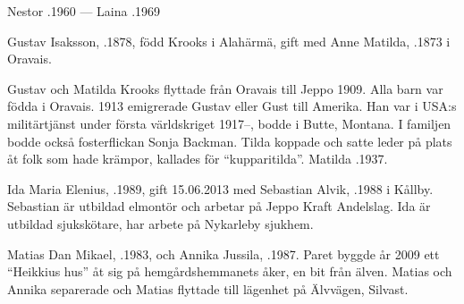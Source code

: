 Nestor .1960  ---  Laina .1969




%
Gustav Isaksson, .1878, född Krooks i Alahärmä, gift med Anne Matilda, .1873 i Oravais.
\begin{jhchildren}
  \item {}
  \item {}
  \item {}
\end{jhchildren}
Gustav och Matilda Krooks flyttade från Oravais till Jeppo 1909. Alla barn var födda i Oravais. 1913 emigrerade Gustav eller Gust till Amerika. Han var i USA:s militärtjänst under första världskriget 1917--, bodde i Butte, Montana. I familjen bodde också fosterflickan Sonja Backman. Tilda koppade och satte leder på plats åt folk som hade krämpor, kallades för ``kupparitilda''. 	Matilda .1937.



%



%
Ida Maria Elenius, .1989, gift 15.06.2013 med Sebastian Alvik, .1988 i Kållby. Sebastian är utbildad elmontör och arbetar på Jeppo Kraft Andelslag. Ida är utbildad sjukskötare, har arbete på Nykarleby sjukhem.
\begin{jhchildren}
  \item {}
  \item {}
\end{jhchildren}



%
Matias Dan Mikael, .1983, och Annika Jussila, .1987. Paret byggde år 2009 ett ``Heikkius hus'' åt sig på hemgårdshemmanets åker, en bit från älven. Matias och Annika separerade och Matias flyttade till lägenhet på Älvvägen, Silvast.
